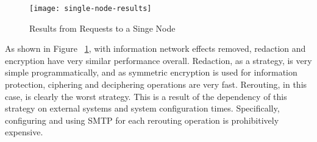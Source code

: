 \begin{figure}[!t]
\centering
\texttt{[image: single-node-results]}
\caption{Results from Requests to a Singe Node}
\label{fig:model:single-node-results}
\end{figure}

As shown in Figure ~\ref{fig:model:single-node-results}, with information network effects removed, redaction and encryption have very similar performance overall.  Redaction, as a strategy, is very simple programmatically, and as symmetric encryption is used for information protection, ciphering and deciphering operations are very fast.  Rerouting, in this case, is clearly the worst strategy.  This is a result of the dependency of this strategy on external systems and system configuration times.  Specifically, configuring and using SMTP for each rerouting operation is prohibitively expensive.